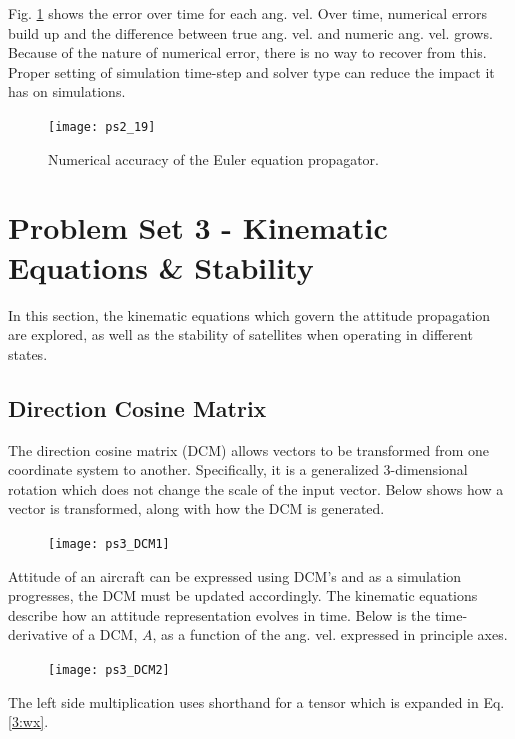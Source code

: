 \documentclass[12pt, letterpaper]{article}
\begin{document}
Fig. \ref{2:error} shows the error over time for each ang. vel. Over time, numerical errors build up and the difference between true ang. vel. and numeric ang. vel. grows. Because of the nature of numerical error, there is no way to recover from this. Proper setting of simulation time-step and solver type can reduce the impact it has on simulations.

\begin{figure}[H]
	\centering
	\texttt{[image: ps2\_19]}
	\caption{Numerical accuracy of the Euler equation propagator.}
	\label{2:error}
\end{figure}




\section{Problem Set 3 - Kinematic Equations \& Stability}

In this section, the kinematic equations which govern the attitude propagation are explored, as well as the stability of satellites when operating in different states.

\subsection{Direction Cosine Matrix}

The direction cosine matrix (DCM) allows vectors to be transformed from one coordinate system to another. Specifically, it is a generalized 3-dimensional rotation which does not change the scale of the input vector. Below shows how a vector is transformed, along with how the DCM is generated.

\begin{figure}[H]
	\centering
	\texttt{[image: ps3\_DCM1]}
\end{figure}

Attitude of an aircraft can be expressed using DCM's and as a simulation progresses, the DCM must be updated accordingly. The kinematic equations describe how an attitude representation evolves in time. Below is the time-derivative of a DCM, $A$, as a function of the ang. vel. expressed in principle axes.

\begin{figure}[H]
	\centering
	\texttt{[image: ps3\_DCM2]}
\end{figure}

The left side multiplication uses shorthand for a tensor which is expanded in Eq. \ref{3:wx}.
\end{document}
